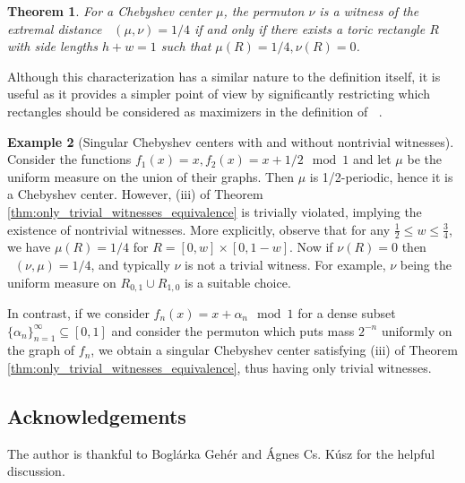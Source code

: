 \documentclass{article}
\newcommand{\ds}{\mathop{d_\square}}
\newtheorem{theorem}{Theorem}[section]
\theoremstyle{definition}
\newtheorem{example}[theorem]{Example}
\begin{document}
\begin{theorem}
    For a Chebyshev center $\mu$, the permuton $\nu$ is a witness of the extremal distance $\ds(\mu, \nu)=1/4$ if and only if there exists a toric rectangle $R$ with side lengths $h+w=1$ such that $\mu(R)=1/4, \nu(R)=0$.
\end{theorem}

Although this characterization has a similar nature to the definition itself, it is useful as it provides a simpler point of view by significantly restricting which rectangles should be considered as maximizers in the definition of $\ds$.

\begin{example}[Singular Chebyshev centers with and without nontrivial witnesses]
    Consider the functions $f_1(x)=x, f_2(x)=x+1/2 \mod 1$ and let $\mu$ be the uniform measure on the union of their graphs. Then $\mu$ is 1/2-periodic, hence it is a Chebyshev center. However, (iii) of Theorem \ref{thm:only_trivial_witnesses_equivalence} is trivially violated, implying the existence of nontrivial witnesses. More explicitly, observe that for any $\frac{1}{2}\leq w\leq \frac{3}{4}$, we have $\mu(R)=1/4$ for $R=[0, w]\times [0, 1-w]$. Now if $\nu(R)=0$ then $\ds(\nu, \mu)=1/4$, and typically $\nu$ is not a trivial witness. For example, $\nu$ being the uniform measure on $R_{0, 1}\cup R_{1, 0}$ is a suitable choice.

    In contrast, if we consider $f_n(x)=x+\alpha_n \mod 1$ for a dense subset $\{\alpha_n\}_{n=1}^{\infty}\subseteq [0, 1]$ and consider the permuton which puts mass $2^{-n}$ uniformly on the graph of $f_n$, we obtain a singular Chebyshev center satisfying (iii) of Theorem \ref{thm:only_trivial_witnesses_equivalence}, thus having only trivial witnesses.
\end{example}

\subsection*{Acknowledgements}

The author is thankful to Boglárka Gehér and Ágnes Cs. Kúsz for the helpful discussion.


\printbibliography
\end{document}
